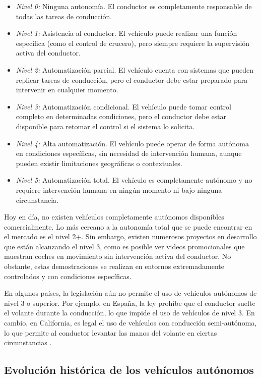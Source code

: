 \begin{itemize}
    \item \textit{Nivel 0:} Ninguna autonomía. El conductor es completamente responsable de todas las tareas de conducción.
    \item \textit{Nivel 1:} Asistencia al conductor. El vehículo puede realizar una función específica (como el control de crucero), pero siempre requiere la supervisión activa del conductor.
    \item \textit{Nivel 2:} Automatización parcial. El vehículo cuenta con sistemas que pueden replicar tareas de conducción, pero el conductor debe estar preparado para intervenir en cualquier momento.
    \item \textit{Nivel 3:} Automatización condicional. El vehículo puede tomar control completo en determinadas condiciones, pero el conductor debe estar disponible para retomar el control si el sistema lo solicita.
    \item \textit{Nivel 4:} Alta automatización. El vehículo puede operar de forma autónoma en condiciones específicas, sin necesidad de intervención humana, aunque pueden existir limitaciones geográficas o contextuales.
    \item \textit{Nivel 5:} Automatización total. El vehículo es completamente autónomo y no requiere intervención humana en ningún momento ni bajo ninguna circunstancia.
\end{itemize}

Hoy en día, no existen vehículos completamente autónomos disponibles comercialmente. Lo más cercano a la autonomía total que se puede encontrar en el mercado es el nivel 2+. Sin embargo, existen numerosos proyectos en desarrollo que están alcanzando el nivel 3, como es posible ver videos promocionales que muestran coches en movimiento sin intervención activa del conductor. No obstante, estas demostraciones se realizan en entornos extremadamente controlados y con condiciones específicas.

En algunos países, la legislación aún no permite el uso de vehículos autónomos de nivel 3 o superior. Por ejemplo, en España, la ley prohíbe que el conductor suelte el volante durante la conducción, lo que impide el uso de vehículos de nivel 3. En cambio, en California, es legal el uso de vehículos con conducción semi-autónoma, lo que permite al conductor levantar las manos del volante en ciertas circunstancias \cite{carwow-autonomous}. 

\subsection{Evolución histórica de los vehículos autónomos}
\label{sec:historia}

